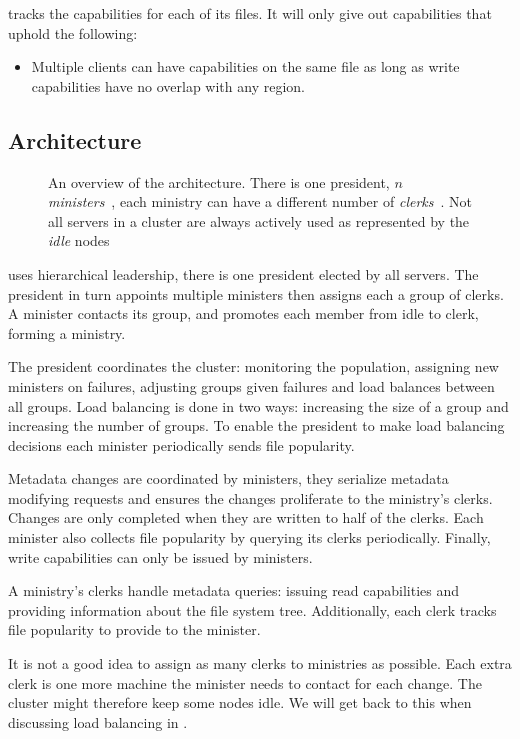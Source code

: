 \begin{samepage}
\Name{} tracks the capabilities for each of its files. It will only give out capabilities that uphold the following:
%
\begin{itemize}
	\item Multiple clients can have capabilities on the same file as long as write capabilities have no overlap with any region.
\end{itemize}
\end{samepage}
% 
\subsection{Architecture} \label{sec:arch}
\begin{figure}
	
	\caption{An overview of the architecture. There is one president, $n$ \emph{ministers}~\amdsLeg{}, each ministry can have a different number of \emph{clerks}~\cmdsLeg{}. Not all servers in a cluster are always actively used as represented by the \emph{idle} nodes~\umdsLeg{}}
\end{figure}

\Name{} uses hierarchical leadership, there is one president elected by all servers. The president in turn appoints multiple ministers then assigns each a group of clerks. A minister contacts its group, and promotes each member from idle to clerk, forming a ministry. 

The president coordinates the cluster: monitoring the population, assigning new ministers on failures, adjusting groups given failures and load balances between all groups. Load balancing is done in two ways: increasing the size of a group and increasing the number of groups. To enable the president to make load balancing decisions each minister periodically sends file popularity.

Metadata changes are coordinated by ministers, they serialize metadata modifying requests and ensures the changes proliferate to the ministry's clerks. Changes are only completed when they are written to half of the clerks. Each minister also collects file popularity by querying its clerks periodically. Finally, write capabilities can only be issued by ministers.

A ministry's clerks handle metadata queries: issuing read capabilities and providing information about the file system tree. Additionally, each clerk tracks file popularity to provide to the minister. 

It is not a good idea to assign as many clerks to ministries as possible. Each extra clerk is one more machine the minister needs to contact for each change. The cluster might therefore keep some nodes idle. We will get back to this when discussing load balancing in .
%
